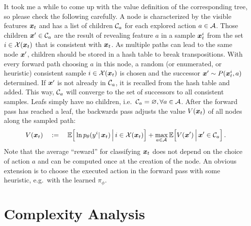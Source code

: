 It took me a while to come up with the value definition
of the corresponding tree, so please check the following carefully.
A node is characterized by the visible features $\bm x_t$
and has a list of children $\mathcal{C}_a$ for each explored action $a \in \mathcal{A}$. 
Those children $\bm x' \in \mathcal{C}_a$ 
are the result of revealing feature $a$ 
in a sample $\bm x^i_t$ from the set $i \in \mathcal{X}(\bm x_t)$
that is consistent with $\bm x_t$. 
As multiple paths can lead to the same node $\bm x'$,
children should be stored in a hash table to break transpositions.
With every forward path choosing $a$ in this node, 
a random (or enumerated, or heuristic) 
consistent sample $i \in \mathcal{X}(\bm x_t)$ is chosen
and the successor $\bm x' \sim P(\bm x^i_t, a)$ determined. 
If $\bm x'$ is not already in $\mathcal{C}_a$,
it is recalled from the hash table and added. 
This way, $\mathcal{C}_a$ will converge to the set of 
successors to all consistent samples.
Leafs simply have no children, 
i.e.~$\mathcal{C}_a = \varnothing, \forall a \in \mathcal{A}$.
After the forward pass has reached a leaf,
the backwards pass adjusts the value $V(\bm x_t)$
of all nodes along the sampled path: 
\begin{align}
	V(\bm x_t) \quad := \quad 
	\mathbb{E}\Big[\ln p_\theta(y^i |\, \bm x_{t}) 
		\,\Big|\, i \in \mathcal{X}(\bm x_t) \Big]
	+
	\max_{a \in \mathcal{A}} 
	\mathbb{E}\Big[ V(\bm x') \,\Big|\,	\bm x' \in \mathcal{C}_a	\Big]  \,.
\end{align}
Note that the average ``reward'' for classifying $\bm x_t$
does not depend on the choice of action $a$
and can be computed once at the creation of the node.
An obvious extension is to choose the executed action
in the forward pass with some heuristic,
e.g.~with the learned $\pi_\phi$. 

\section{Complexity Analysis}

\def\FormatName#1{#1}

{\footnotesize}


